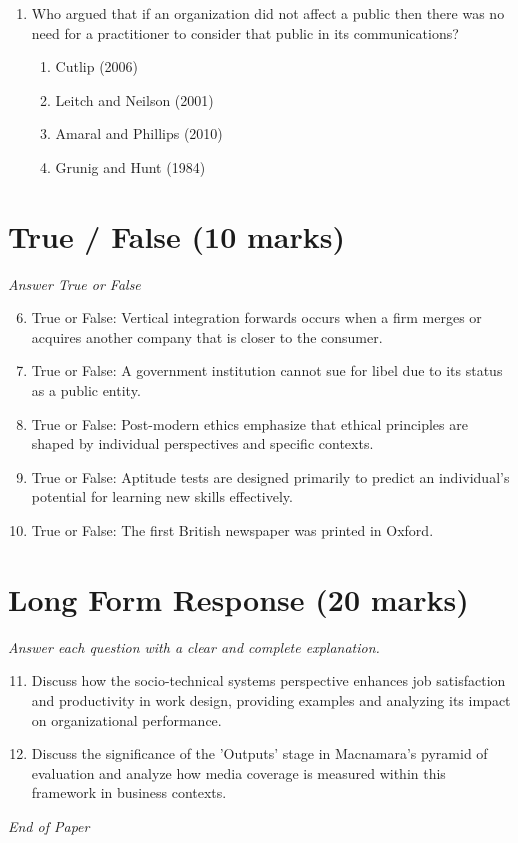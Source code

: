 \documentclass[12pt]{article}
\begin{document}
\begin{enumerate}[label=\arabic*.]
\begin{enumerate}[label=(\alph*)]
    \item Business to business
\end{enumerate}
\item Who argued that if an organization did not affect a public then there was no need for a practitioner to consider that public in its communications?
\begin{enumerate}[label=(\alph*)]
    \item Cutlip (2006)
    \item Leitch and Neilson (2001)
    \item Amaral and Phillips (2010)
    \item Grunig and Hunt (1984)
\end{enumerate}
\end{enumerate}

\section*{True / False (10 marks)}
\textit{Answer True or False}
\begin{enumerate}[label=\arabic*.]
\setcounter{enumi}{5}
\item True or False: Vertical integration forwards occurs when a firm merges or acquires another company that is closer to the consumer.
\item True or False: A government institution cannot sue for libel due to its status as a public entity.
\item True or False: Post-modern ethics emphasize that ethical principles are shaped by individual perspectives and specific contexts.
\item True or False: Aptitude tests are designed primarily to predict an individual's potential for learning new skills effectively.
\item True or False: The first British newspaper was printed in Oxford.
\end{enumerate}

\section*{Long Form Response (20 marks)}
\textit{Answer each question with a clear and complete explanation.}
\begin{enumerate}[label=\arabic*.]
\setcounter{enumi}{10}
\item Discuss how the socio-technical systems perspective enhances job satisfaction and productivity in work design, providing examples and analyzing its impact on organizational performance.
\item Discuss the significance of the 'Outputs' stage in Macnamara's pyramid of evaluation and analyze how media coverage is measured within this framework in business contexts.
\end{enumerate}

\vfill
\noindent\textit{End of Paper}
\end{document}
